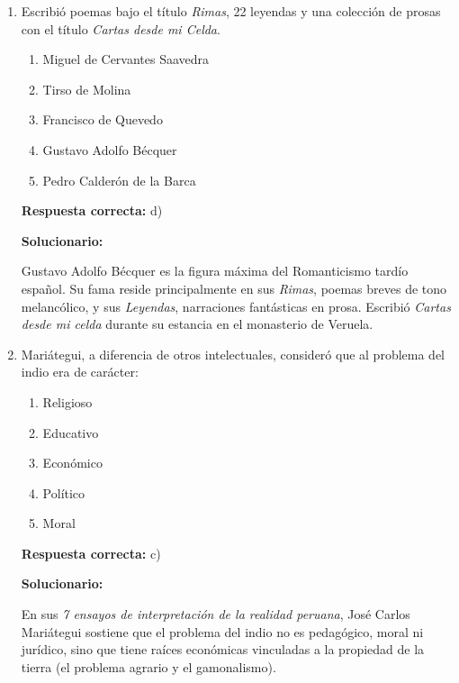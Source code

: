 \begin{enumerate}[resume]

\item Escribió poemas bajo el título \textit{Rimas}, 22 leyendas y una colección de prosas con el título \textit{Cartas desde mi Celda}.

\begin{enumerate}[label=\alph*)]
	\item Miguel de Cervantes Saavedra
	\item Tirso de Molina
	\item Francisco de Quevedo
	\item Gustavo Adolfo Bécquer
	\item Pedro Calderón de la Barca
\end{enumerate}

\textbf{Respuesta correcta:} d)

\vspace{2mm}
\textbf{Solucionario:}


Gustavo Adolfo Bécquer es la figura máxima del Romanticismo tardío español. Su fama reside principalmente en sus \textit{Rimas}, poemas breves de tono melancólico, y sus \textit{Leyendas}, narraciones fantásticas en prosa. Escribió \textit{Cartas desde mi celda} durante su estancia en el monasterio de Veruela.

\vspace{6mm}

\item Mariátegui, a diferencia de otros intelectuales, consideró que al problema del indio era de carácter:

\begin{enumerate}[label=\alph*)]
	\item Religioso
	\item Educativo
	\item Económico
	\item Político
	\item Moral
\end{enumerate}

\textbf{Respuesta correcta:} c)

\vspace{2mm}
\textbf{Solucionario:}

En sus \textit{7 ensayos de interpretación de la realidad peruana}, José Carlos Mariátegui sostiene que el problema del indio no es pedagógico, moral ni jurídico, sino que tiene raíces económicas vinculadas a la propiedad de la tierra (el problema agrario y el gamonalismo).

\vspace{6mm}


\end{enumerate}






